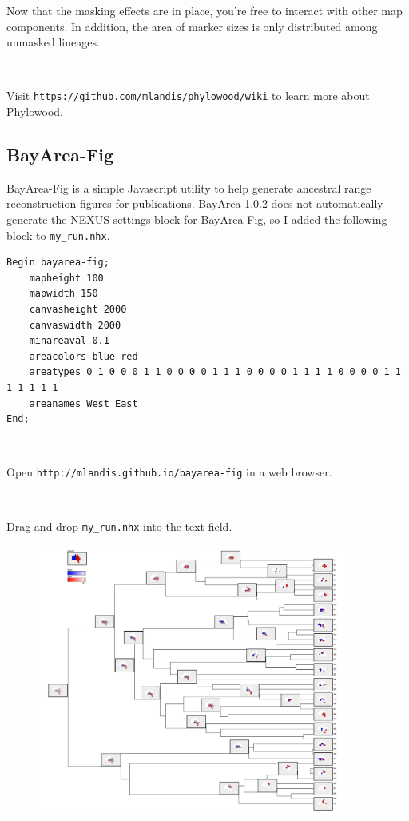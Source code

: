 \documentclass[11pt]{article}
\newcommand{\impmark}{\strut\vadjust{\domark}}
\newcommand{\domark}{%
  \vbox to 0pt{
    \kern-\dp\strutbox
    \smash{\llap{$\rightarrow$\kern1em}}
    \vss
  }%
}
\begin{document}
Now that the masking effects are in place, you're free to interact with other map components.
In addition, the area of marker sizes is only distributed among unmasked lineages.

\noindent \\ \impmark Visit \texttt{https://github.com/mlandis/phylowood/wiki} to learn more about Phylowood.


\subsection{BayArea-Fig}

BayArea-Fig is a simple Javascript utility to help generate ancestral range reconstruction figures for publications.
BayArea 1.0.2 does not automatically generate the NEXUS settings block for BayArea-Fig, so I added the following block to \texttt{my\_run.nhx}.

\begin{framed}
\begin{lstlisting}
Begin bayarea-fig;
	mapheight 100
	mapwidth 150
	canvasheight 2000
	canvaswidth 2000
	minareaval 0.1
	areacolors blue red
	areatypes 0 1 0 0 0 1 1 0 0 0 0 1 1 1 0 0 0 0 1 1 1 1 0 0 0 0 1 1 1 1 1 1 1
	areanames West East
End;
\end{lstlisting}
\end{framed}

\noindent \\ \impmark  Open \texttt{http://mlandis.github.io/bayarea-fig} in a web browser.

\noindent \\ \impmark  Drag and drop \texttt{my\_run.nhx} into the text field. \\

\begin{figure}[H]
\centering
\includegraphics[width=4in]{figures/bayarea-fig}
\end{figure}
\end{document}
